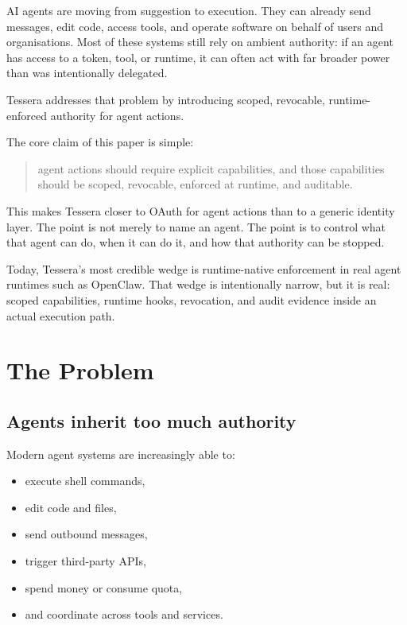\documentclass[11pt, a4paper]{article}
\begin{document}
AI agents are moving from suggestion to execution. They can already send messages, edit code, access tools, and operate software on behalf of users and organisations. Most of these systems still rely on ambient authority: if an agent has access to a token, tool, or runtime, it can often act with far broader power than was intentionally delegated.

Tessera addresses that problem by introducing scoped, revocable, runtime-enforced authority for agent actions.

The core claim of this paper is simple:

\begin{quote}
agent actions should require explicit capabilities, and those capabilities should be scoped, revocable, enforced at runtime, and auditable.
\end{quote}

This makes Tessera closer to OAuth for agent actions than to a generic identity layer. The point is not merely to name an agent. The point is to control what that agent can do, when it can do it, and how that authority can be stopped.

Today, Tessera's most credible wedge is runtime-native enforcement in real agent runtimes such as OpenClaw. That wedge is intentionally narrow, but it is real: scoped capabilities, runtime hooks, revocation, and audit evidence inside an actual execution path.

\section{The Problem}

\subsection{Agents inherit too much authority}

Modern agent systems are increasingly able to:

\begin{itemize}
  \item execute shell commands,
  \item edit code and files,
  \item send outbound messages,
  \item trigger third-party APIs,
  \item spend money or consume quota,
  \item and coordinate across tools and services.
\end{itemize}
\end{document}
